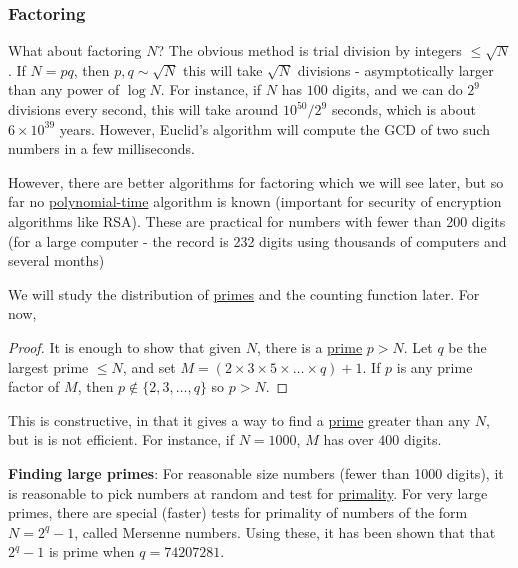 \documentclass{article}
\begin{document}
\subsubsection*{Factoring}
What about factoring $N$? The obvious method is trial division by integers $\leq \sqrt{N}$.
If $N = pq$, then $p, q \sim \sqrt{N}$ this will take $\sqrt{N}$ divisions - asymptotically larger than any power of $\log N$.
For instance, if $N$ has $100$ digits, and we can do $2^9$ divisions every second, this will take around $10^{50} / 2^9$ seconds, which is about $6 \times 10^{39}$ years.
However, Euclid's algorithm will compute the GCD of two such numbers in a few milliseconds.

However, there are better algorithms for factoring which we will see later, but so far no \hyperlink{def:poly}{polynomial-time} algorithm is known (important for security of encryption algorithms like RSA).
These are practical for numbers with fewer than 200 digits (for a large computer - the record is 232 digits using thousands of computers and several months)

We will study the distribution of \hyperlink{def:prime}{primes} and the counting function later.  For now,
\begin{proof}
    It is enough to show that given $N$, there is a \hyperlink{def:prime}{prime} $p > N$. Let $q$ be the largest prime $\leq N$, and set $M = (2 \times 3 \times 5 \times \dots \times q) + 1$.
    If $p$ is any prime factor of $M$, then $p \notin \{2, 3, \dotsc, q\}$ so $p > N$.
\end{proof}

\begin{remark}
    This is constructive, in that it gives a way to find a \hyperlink{def:prime}{prime} greater than any $N$, but is is not efficient. For instance, if $N=1000$, $M$ has over $400$ digits.
\end{remark}

\textbf{Finding large primes}: For reasonable size numbers (fewer than 1000 digits), it is reasonable to pick numbers at random and test for \hyperlink{def:prime}{primality}.
For very large primes, there are special (faster) tests for primality of numbers of the form $N = 2^q - 1$, called Mersenne numbers.
Using these, it has been shown that that $2^q - 1$ is prime when $q = 74207281$.
\end{document}
